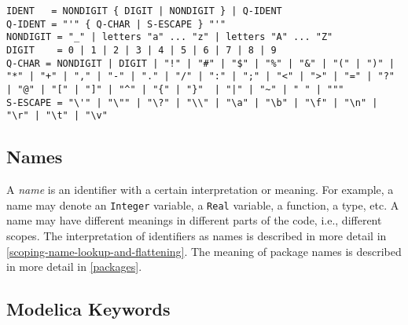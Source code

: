 \begin{lstlisting}[language=grammar,mathescape=false]
IDENT   = NONDIGIT { DIGIT | NONDIGIT } | Q-IDENT
Q-IDENT = "'" { Q-CHAR | S-ESCAPE } "'"
NONDIGIT = "_" | letters "a" ... "z" | letters "A" ... "Z"
DIGIT    = 0 | 1 | 2 | 3 | 4 | 5 | 6 | 7 | 8 | 9
Q-CHAR = NONDIGIT | DIGIT | "!" | "#" | "$" | "%" | "&" | "(" | ")" | "*" | "+" | "," | "-" | "." | "/" | ":" | ";" | "<" | ">" | "=" | "?" | "@" | "[" | "]" | "^" | "{" | "}"  | "|" | "~" | " " | """
S-ESCAPE = "\'" | "\"" | "\?" | "\\" | "\a" | "\b" | "\f" | "\n" | "\r" | "\t" | "\v"
\end{lstlisting}

\subsection{Names}\label{names}

A \emph{name} is an identifier with a certain interpretation or meaning.
For example, a name may denote an \lstinline!Integer! variable, a \lstinline!Real! variable, a
function, a type, etc. A name may have different meanings in different
parts of the code, i.e., different scopes. The interpretation of
identifiers as names is described in more detail in \cref{scoping-name-lookup-and-flattening}. The
meaning of package names is described in more detail in \cref{packages}.

\subsection{Modelica Keywords}\label{modelica-keywords}

